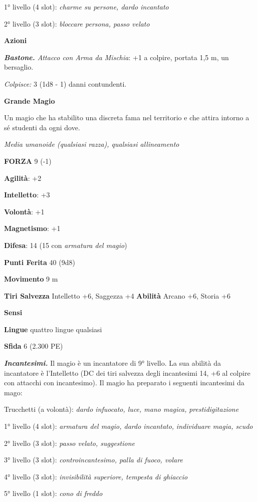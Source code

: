 \begin{multicols}{2}
1° livello (4 slot): \emph{charme su persone, dardo incantato}

2° livello (3 slot): \emph{bloccare persona, passo velato}

\textbf{Azioni}

\emph{\textbf{Bastone.} Attacco con Arma da Mischia}: +1 a colpire,
portata 1,5 m, un bersaglio.

\emph{Colpisce:} 3 (1d8 - 1) danni contundenti.

\textbf{Grande Magio}

Un magio che ha stabilito una discreta fama nel territorio e che attira
intorno a sé studenti da ogni dove.

\emph{Media umanoide (qualsiasi razza), qualsiasi allineamento}

\textbf{FORZA} 9 (-1)

\textbf{Agilità}: +2

\textbf{Intelletto}: +3

\textbf{Volontà}: +1

\textbf{Magnetismo}: +1

\textbf{Difesa}: 14 (15 con \emph{armatura del magio})

\textbf{Punti Ferita} 40 (9d8)

\textbf{Movimento} 9 m

\textbf{Tiri Salvezza} Intelletto +6, Saggezza +4 \textbf{Abilità}
Arcano +6, Storia +6

\textbf{Sensi} 

\textbf{Lingue} quattro lingue qualsiasi

\textbf{Sfida} 6 (2.300 PE)

\emph{\textbf{Incantesimi.}} Il magio è un incantatore di 9° livello. La
sua abilità da incantatore è l'Intelletto (DC dei tiri salvezza degli
incantesimi 14, +6 al colpire con attacchi con incantesimo). Il magio ha
preparato i seguenti incantesimi da mago:

Trucchetti (a volontà): \emph{dardo infuocato, luce, mano magica,}
\emph{prestidigitazione}

1° livello (4 slot): \emph{armatura del magio, dardo incantato,}
\emph{individuare magia, scudo}

2° livello (3 slot): \emph{passo velato, suggestione}

3° livello (3 slot): \emph{controincantesimo, palla di fuoco, volare}

4° livello (3 slot): \emph{invisibilità superiore, tempesta di ghiaccio}

5° livello (1 slot): \emph{cono di freddo}


\end{multicols}
